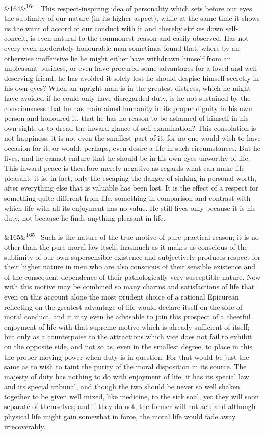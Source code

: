 \documentclass[12pt]{article}
\newcommand{\para}[1][]{\par\noindent\ifx&#1&\else\textsuperscript{\footnotesize #1}~\fi}
\begin{document}
\para[164] This respect-inspiring idea of personality which sets before our eyes the sublimity of our nature (in its higher aspect), while at the same time it shows us the want of accord of our conduct with it and thereby strikes down self-conceit, is even natural to the commonest reason and easily observed. Has not every even moderately honourable man sometimes found that, where by an otherwise inoffensive lie he might either have withdrawn himself from an unpleasant business, or even have procured some advantages for a loved and well-deserving friend, he has avoided it solely lest he should despise himself secretly in his own eyes? When an upright man is in the greatest distress, which he might have avoided if he could only have disregarded duty, is he not sustained by the consciousness that he has maintained humanity in its proper dignity in his own person and honoured it, that he has no reason to be ashamed of himself in his own sight, or to dread the inward glance of self-examination? This consolation is not happiness, it is not even the smallest part of it, for no one would wish to have occasion for it, or would, perhaps, even desire a life in such circumstances. But he lives, and he cannot endure that he should be in his own eyes unworthy of life. This inward peace is therefore merely negative as regards what can make life pleasant; it is, in fact, only the escaping the danger of sinking in personal worth, after everything else that is valuable has been lost. It is the effect of a respect for something quite different from life, something in comparison and contrast with which life with all its enjoyment has no value. He still lives only because it is his duty, not because he finds anything pleasant in life.

\para[165] Such is the nature of the true motive of pure practical reason; it is no other than the pure moral law itself, inasmuch as it makes us conscious of the sublimity of our own supersensible existence and subjectively produces respect for their higher nature in men who are also conscious of their sensible existence and of the consequent dependence of their pathologically very susceptible nature. Now with this motive may be combined so many charms and satisfactions of life that even on this account alone the most prudent choice of a rational Epicurean reflecting on the greatest advantage of life would declare itself on the side of moral conduct, and it may even be advisable to join this prospect of a cheerful enjoyment of life with that supreme motive which is already sufficient of itself; but only as a counterpoise to the attractions which vice does not fail to exhibit on the opposite side, and not so as, even in the smallest degree, to place in this the proper moving power when duty is in question. For that would be just the same as to wish to taint the purity of the moral disposition in its source. The majesty of duty has nothing to do with enjoyment of life; it has its special law and its special tribunal, and though the two should be never so well shaken together to be given well mixed, like medicine, to the sick soul, yet they will soon separate of themselves; and if they do not, the former will not act; and although physical life might gain somewhat in force, the moral life would fade away irrecoverably.
\end{document}
